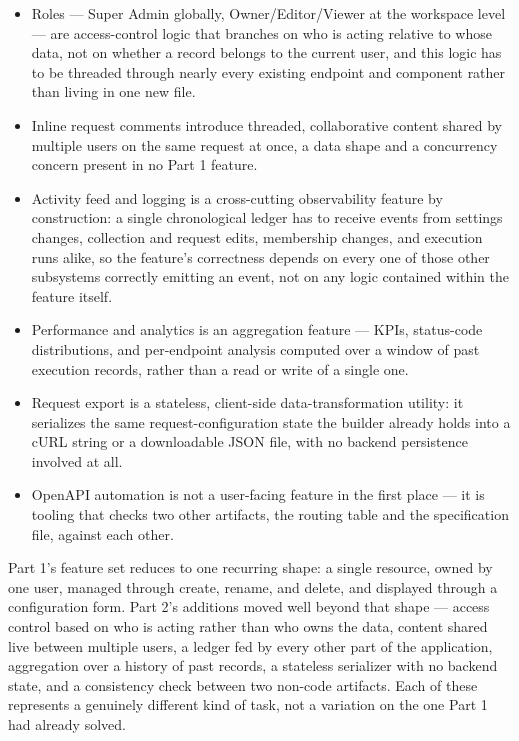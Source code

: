 \begin{itemize}[itemsep=6pt, parsep=0pt, topsep=6pt]
    \item Roles --- Super Admin globally, Owner/Editor/Viewer at the workspace level --- are access-control logic that branches on who is acting relative to whose data, not on whether a record belongs to the current user, and this logic has to be threaded through nearly every existing endpoint and component rather than living in one new file.
    \item Inline request comments introduce threaded, collaborative content shared by multiple users on the same request at once, a data shape and a concurrency concern present in no Part 1 feature.
    \item Activity feed and logging is a cross-cutting observability feature by construction: a single chronological ledger has to receive events from settings changes, collection and request edits, membership changes, and execution runs alike, so the feature's correctness depends on every one of those other subsystems correctly emitting an event, not on any logic contained within the feature itself.
    \item Performance and analytics is an aggregation feature --- KPIs, status-code distributions, and per-endpoint analysis computed over a window of past execution records, rather than a read or write of a single one.
    \item Request export is a stateless, client-side data-transformation utility: it serializes the same request-configuration state the builder already holds into a cURL string or a downloadable JSON file, with no backend persistence involved at all.
    \item OpenAPI automation is not a user-facing feature in the first place --- it is tooling that checks two other artifacts, the routing table and the specification file, against each other.
\end{itemize}

Part 1's feature set reduces to one recurring shape: a single resource, owned by one user, managed through create, rename, and delete, and displayed through a configuration form. Part 2's additions moved well beyond that shape --- access control based on who is acting rather than who owns the data, content shared live between multiple users, a ledger fed by every other part of the application, aggregation over a history of past records, a stateless serializer with no backend state, and a consistency check between two non-code artifacts. Each of these represents a genuinely different kind of task, not a variation on the one Part 1 had already solved.

